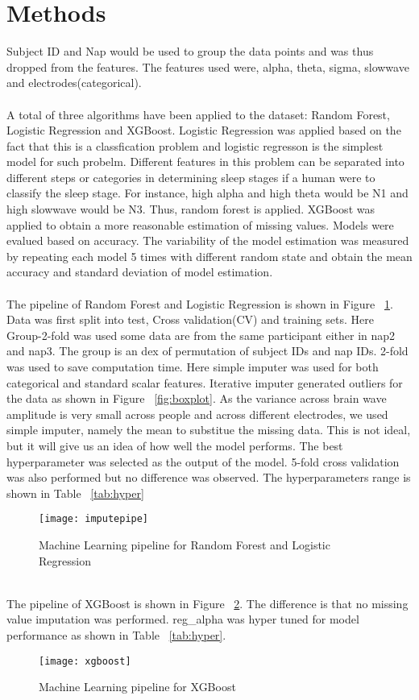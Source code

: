 \section*{Methods}
Subject ID and Nap would be used to group the data points and was thus dropped from the features. The features used were, alpha, theta, sigma, slowwave and electrodes(categorical).\\ 
\\
A total of three algorithms have been applied to the dataset: Random Forest, Logistic Regression and XGBoost. Logistic Regression was applied based on the fact that this is a classfication problem and logistic regresson is the simplest model for such probelm. Different features in this problem can be separated into different steps or categories in determining sleep stages if a human were to classify the sleep stage. For instance, high alpha and high theta would be N1 and high slowwave would be N3. Thus, random forest is applied. XGBoost was applied to obtain a more reasonable estimation of missing values. Models were evalued based on accuracy. The variability of the model estimation was measured by repeating each model 5 times with different random state and obtain the mean accuracy and standard deviation of model estimation. \\
\\
The pipeline of Random Forest and Logistic Regression is shown in Figure ~\ref{fig:mlpipeline1}. Data was first split into test, Cross validation(CV) and training sets. Here Group-2-fold was used some data are from the same participant either in nap2 and nap3. The group is an dex of permutation of subject IDs and nap IDs. 2-fold was used to save computation time. Here simple imputer was used for both categorical and standard scalar features. Iterative imputer generated outliers for the data as shown in Figure ~\ref{fig:boxplot}. As the variance across brain wave amplitude is very small across people and across different electrodes, we used simple imputer, namely the mean to substitue the missing data. This is not ideal, but it will give us an idea of how well the model performs. The best hyperparameter was selected as the output of the model. 5-fold cross validation was also performed but no difference was observed. The hyperparameters range is shown in Table ~\ref{tab:hyper}\\
\begin{figure}[ht]
  \texttt{[image: imputepipe]}
  \caption{Machine Learning pipeline for Random Forest and Logistic Regression}
  \label{fig:mlpipeline1}
\end{figure} 
\\
The pipeline of XGBoost is shown in Figure ~\ref{fig:xgboost}. The difference is that no missing value imputation was performed. reg\_alpha was hyper tuned for model performance as shown in Table ~\ref{tab:hyper}. 
\begin{figure}[ht]
  \texttt{[image: xgboost]}
  \caption{Machine Learning pipeline for XGBoost}
  \label{fig:xgboost}
\end{figure} 


